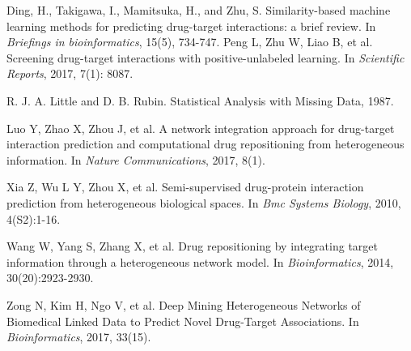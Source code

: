 \documentclass[sigconf,anonymous]{acmart}
\begin{document}
\begin{thebibliography}{10}
Ding, H., Takigawa, I., Mamitsuka, H., and Zhu, S.
\newblock Similarity-based machine learning methods for predicting drug-target interactions: a brief review. \newblock In {\em Briefings in bioinformatics}, 15(5), 734-747.
Peng L, Zhu W, Liao B, et al.
\newblock Screening drug-target interactions with positive-unlabeled learning.
\newblock In {\em Scientific Reports}, 2017, 7(1): 8087.

R. J. A. Little and D. B. Rubin.
\newblock Statistical Analysis with Missing Data, 1987.

Luo Y, Zhao X, Zhou J, et al.
\newblock A network integration approach for drug-target interaction prediction and computational drug repositioning from heterogeneous information.
\newblock In {\em Nature Communications}, 2017, 8(1).

Xia Z, Wu L Y, Zhou X, et al. 
\newblock Semi-supervised drug-protein interaction prediction from heterogeneous biological spaces. 
\newblock In {\em Bmc Systems Biology}, 2010, 4(S2):1-16.

Wang W, Yang S, Zhang X, et al. 
\newblock Drug repositioning by integrating target information through a heterogeneous network model. 
\newblock In {\em Bioinformatics}, 2014, 30(20):2923-2930.

Zong N, Kim H, Ngo V, et al. 
\newblock Deep Mining Heterogeneous Networks of Biomedical Linked Data to Predict Novel Drug-Target Associations. 
\newblock In {\em Bioinformatics}, 2017, 33(15).

%
%
%
\end{thebibliography}
\end{document}
